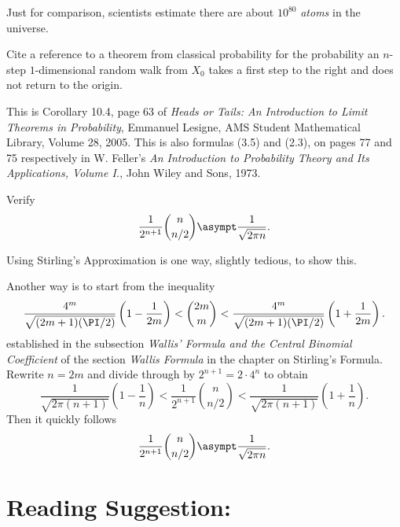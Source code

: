 \documentclass[12pt]{article}
\begin{document}
\begin{example}
\begin{solution}
    Just for comparison, scientists estimate there are about \( 10^{80} \)
    \emph{atoms} in the universe.
\end{solution}

\begin{exercise}
    Cite a reference to a theorem from classical probability for the
    probability an \( n \)-step \( 1 \)-dimensional random walk from \(
    X_0 \) takes a first step to the right and does not return to the
    origin.
\end{exercise}
\begin{solution}
    This is Corollary 10.4, page 63 of \textit{Heads or Tails:  An
    Introduction to Limit Theorems in Probability}, Emmanuel Lesigne,
    AMS Student Mathematical Library, Volume 28, 2005.  This is also
    formulas (3.5) and (2.3), on pages 77 and 75 respectively in W.
    Feller's \textit{An Introduction to Probability Theory and Its
    Applications, Volume I.}, John Wiley and Sons, 1973.
\end{solution}

\begin{exercise}
    Verify
    \[
        \frac{1}{2^{n+1}}\binom{n}{n/2} \asympt \frac{1}{\sqrt{2 \pi n}}.
    \]
\end{exercise}
\begin{solution}
    Using Stirling's Approximation is one way, slightly tedious, to show
    this.

    Another way is to start from the inequality
    \[
        \frac{4^m}{\sqrt{(2m+1)(\PI/2)}}\left(1-\frac{1}{2m} \right) < {\binom
        {2m}{m}} < \frac{4^m}{\sqrt{(2m+1)(\PI/2)}} \left(1 + \frac{1}{2m}
        \right).
    \] established in the subsection \emph{Wallis' Formula and the
    Central Binomial Coefficient} of the section \emph{Wallis Formula}
    in the chapter on Stirling's Formula.  Rewrite \( n = 2m \) and
    divide through by \( 2^{n + 1} = 2 \cdot 4^n \) to obtain
    \[
        \frac{1}{\sqrt{2\pi(n+1)}} \left( 1 - \frac{1}{n} \right) <
        \frac{1}{2^{n+1}} \binom{n}{n/2} < \frac{1}{\sqrt{2\pi(n+1)}}
        \left( 1 + \frac{1}{n} \right).
    \] Then it quickly follows
    \[
        \frac{1}{2^{n+1}}\binom{n}{n/2} \asympt \frac{1}{\sqrt{2 \pi n}}.
    \]
\end{solution}

\hr

\section*{Reading Suggestion:}


\end{example}
\end{document}
